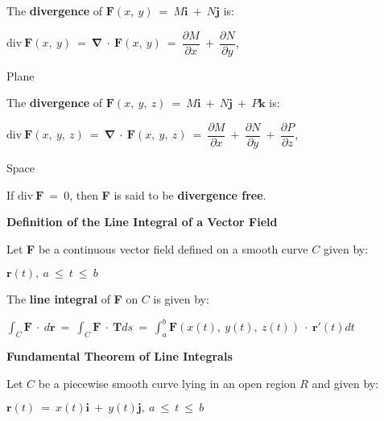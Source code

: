 \documentclass{article}
\begin{document}
\begin{large}
\hspace{0.1in} The \textbf{divergence} of $\textbf{F}(x,\ y)\ =\ M\textbf{i}\ +\ N\textbf{j}$ is:

\hspace{1.0in} $\text{div}\ \textbf{F}(x,\ y)\ =\ \mathbf{\nabla}\ \cdot\ \textbf{F}(x,\ y)\ =\ \dfrac{\partial M}{\partial x}\ +\ \dfrac{\partial N}{\partial y}$, \begin{large} Plane \end{large}

\hspace{0.1in} The \textbf{divergence} of $\textbf{F}(x,\ y,\ z)\ =\ M\textbf{i}\ +\ N\textbf{j}\ +\ P\textbf{k}$ is:

\hspace{1.0in} $\text{div}\ \textbf{F}(x,\ y,\ z)\ =\ \mathbf{\nabla}\ \cdot\ \textbf{F}(x,\ y,\ z)\ =\ \dfrac{\partial M}{\partial x}\ +\ \dfrac{\partial N}{\partial y}\ +\ \dfrac{\partial P}{\partial z}$, \begin{large} Space \end{large}

\hspace{0.1in} If $\text{div}\ \textbf{F}\ =\ 0$, then \textbf{F} is said to be \textbf{divergence free}.

\textbf{Definition of the Line Integral of a Vector Field}

\hspace{0.1in} Let \textbf{F} be a continuous vector field defined on a smooth curve $C$ given by:

\vspace{-0.2in}
\hspace{2.5in} $\textbf{r}(t),\ a\ \leq\ t\ \leq\ b$

\hspace{0.1in} The \textbf{line integral} of \textbf{F} on $C$ is given by:

\hspace{1.0in} $\displaystyle\int_{C}\textbf{F}\ \cdot\ d\textbf{r}\ =\ \displaystyle\int_{C}\textbf{F}\ \cdot\ \textbf{T}ds\ =\ \displaystyle\int^{b}_{a}\textbf{F}(x(t),\ y(t),\ z(t))\ \cdot\ \textbf{r}'(t)dt$

\textbf{Fundamental Theorem of Line Integrals}

\hspace{0.1in} Let $C$ be a piecewise smooth curve lying in an open region $R$ and given by:

\hspace{1.5in} $\textbf{r}(t)\ =\ x(t)\textbf{i}\ +\ y(t)\textbf{j},\ a\ \leq\ t\ \leq\ b$


\end{large}
\end{document}
